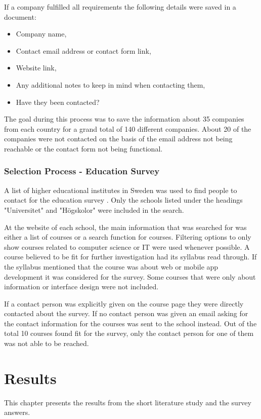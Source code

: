 \documentclass[a4paper,12pt]{article}
\begin{document}
If a company fulfilled all requirements the following details were saved in a document:

\begin{itemize}
    \item Company name,
    \item Contact email address or contact form link,
    \item Website link,
    \item Any additional notes to keep in mind when contacting them,
    \item Have they been contacted?
\end{itemize}

The goal during this process was to save the information about 35 companies from each country for a grand total of 140 different companies. About 20 of the companies were not contacted on the basis of the email address not being reachable or the contact form not being functional.

\subsubsection{Selection Process - Education Survey}
\label{Project_participantSelection_processEdu}
A list of higher educational institutes in Sweden was used to find people to contact for the education survey \cite{higher_edu_sweden}. Only the schools listed under the headings "Universitet" and "Högskolor" were included in the search.

At the website of each school, the main information that was searched for was either a list of courses or a search function for courses. Filtering options to only show courses related to computer science or IT were used whenever possible. A course believed to be fit for further investigation had its syllabus read through. If the syllabus mentioned that the course was about web or mobile app development it was considered for the survey. Some courses that were only about information or interface design were not included.

If a contact person was explicitly given on the course page they were directly contacted about the survey. If no contact person was given an email asking for the contact information for the courses was sent to the school instead. Out of the total 10 courses found fit for the survey, only the contact person for one of them was not able to be reached.

\newpage

\section{Results}
\label{Results}
This chapter presents the results from the short literature study and the survey answers.
\end{document}
